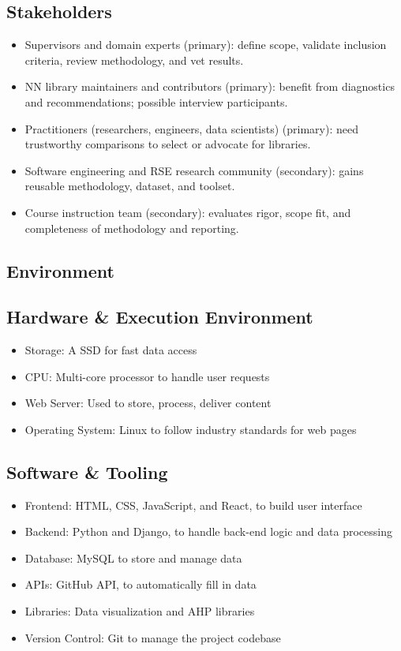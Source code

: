 \documentclass{article}
\begin{document}

\subsection{Stakeholders}
\begin{itemize}
  \item Supervisors and domain experts (primary): define scope, validate inclusion criteria,
  review methodology, and vet results.
  \item NN library maintainers and contributors (primary): benefit from diagnostics
  and recommendations; possible interview participants.
  \item Practitioners (researchers, engineers, data scientists) (primary): need trustworthy
  comparisons to select or advocate for libraries.
  \item Software engineering and RSE research community (secondary): gains reusable
  methodology, dataset, and toolset.
  \item Course instruction team (secondary): evaluates rigor, scope fit, and completeness
  of methodology and reporting.
\end{itemize}


\subsection{Environment}
\subsection{Hardware \& Execution Environment}

\begin{itemize}
    \item Storage: A SSD for fast data access
    \item CPU: Multi-core processor to handle user requests
    \item Web Server: Used to store, process, deliver content
    \item Operating System: Linux to follow industry standards for web pages
\end{itemize}
\subsection{Software \& Tooling}
\begin{itemize}
    \item Frontend: HTML, CSS, JavaScript, and React, to build user interface
    \item Backend: Python and Django, to handle back-end logic and data processing
    \item Database: MySQL to store and manage data
    \item APIs: GitHub API, to automatically fill in data
    \item Libraries: Data visualization and AHP libraries
    \item Version Control: Git to manage the project codebase
\end{itemize}
\end{document}
